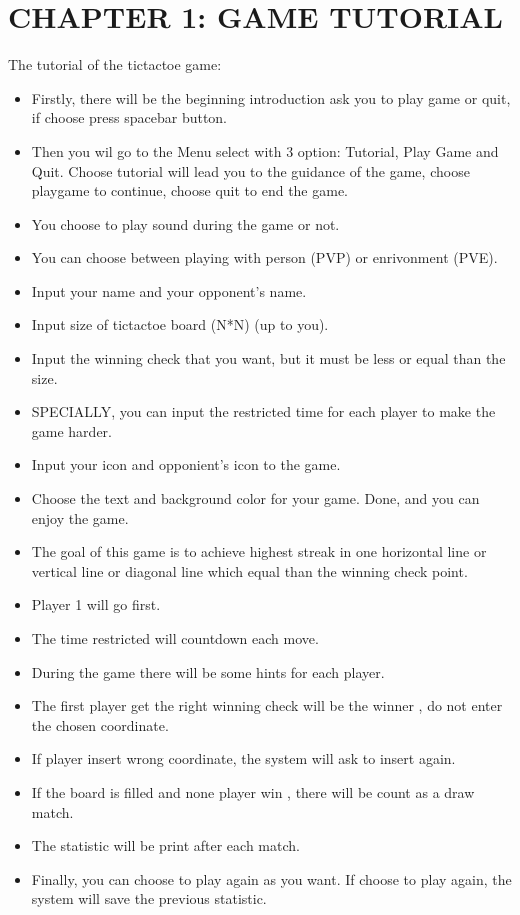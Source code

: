 \documentclass[12pt,a4paper]{article}
\begin{document}
\section{\textbf{\color{red}CHAPTER 1: GAME TUTORIAL}}
The tutorial of the tictactoe game:
\begin{itemize}
    \item  Firstly, there will be the beginning introduction ask you to play game or quit, if choose press spacebar button.
    \item  Then you wil go to the Menu select with 3 option: Tutorial, Play Game and Quit. Choose tutorial will lead you to the guidance of the game, choose playgame to continue, choose quit to end the game.
    \item  You choose to play sound during the game or not.
    \item  You can choose between playing with person (PVP) or enrivonment (PVE).
    \item  Input your name and your opponent's name.
    \item  Input size of tictactoe board (N*N) (up to you).
    \item  Input the winning check that you want, but it must be less or equal than the size.
    \item  SPECIALLY, you can input the restricted time for each player to make the game harder.
    \item  Input your icon and opponient's icon to the game.
    \item  Choose the text and background color for your game. Done, and you can enjoy the game.
    \item  The goal of this game is to achieve highest streak in one horizontal line or vertical line or diagonal line which equal than the winning check point.
    \item  Player 1 will go first.
    \item  The time restricted will countdown each move.
    \item  During the game there will be some hints for each player.
    \item  The first player get the right winning check will be the winner , do not enter the chosen coordinate.
    \item  If player insert wrong coordinate, the system will ask to insert again.
    \item  If the board is filled and none player win , there will be count as a draw match.
    \item  The statistic will be print after each match.
    \item  Finally, you can choose to play again as you want. If choose to play again, the system will save the previous statistic.
\end{itemize}
\end{document}
